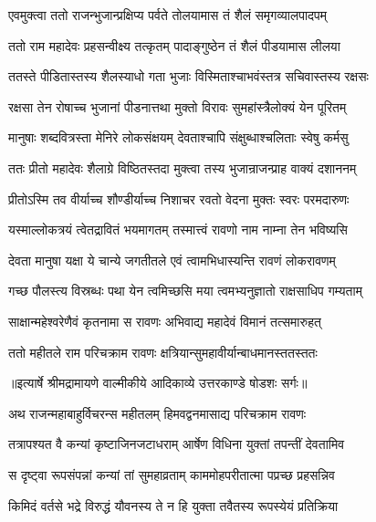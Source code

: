 \twolineshloka
{एवमुक्त्वा ततो राजन्भुजान्प्रक्षिप्य पर्वते}
{तोलयामास तं शैलं समृगव्यालपादपम्} %

\twolineshloka
{ततो राम महादेवः प्रहसन्वीक्ष्य तत्कृतम्}
{पादाङ्गुष्ठेन तं शैलं पीडयामास लीलया} %

\twolineshloka
{ततस्ते पीडितास्तस्य शैलस्याधो गता भुजाः}
{विस्मिताश्चाभवंस्तत्र सचिवास्तस्य रक्षसः} %

\twolineshloka
{रक्षसा तेन रोषाच्च भुजानां पीडनात्तथा}
{मुक्तो विरावः सुमहांस्त्रैलोक्यं येन पूरितम्} %

\twolineshloka
{मानुषाः शब्दवित्रस्ता मेनिरे लोकसंक्षयम्}
{देवताश्चापि संक्षुब्धाश्चलिताः स्वेषु कर्मसु} %

\twolineshloka
{ततः प्रीतो महादेवः शैलाग्रे विष्ठितस्तदा}
{मुक्त्वा तस्य भुजान्राजन्प्राह वाक्यं दशाननम्} %

\twolineshloka
{प्रीतोऽस्मि तव वीर्याच्च शौण्डीर्याच्च निशाचर}
{रवतो वेदना मुक्तः स्वरः परमदारुणः} %

\twolineshloka
{यस्माल्लोकत्रयं त्वेतद्रावितं भयमागतम्}
{तस्मात्त्वं रावणो नाम नाम्ना तेन भविष्यसि} %

\twolineshloka
{देवता मानुषा यक्षा ये चान्ये जगतीतले}
{एवं त्वामभिधास्यन्ति रावणं लोकरावणम्} %

\twolineshloka
{गच्छ पौलस्त्य विस्रब्धः पथा येन त्वमिच्छसि}
{मया त्वमभ्यनुज्ञातो राक्षसाधिप गम्यताम्} %

\twolineshloka
{साक्षान्महेश्वरेणैवं कृतनामा स रावणः}
{अभिवाद्य महादेवं विमानं तत्समारुहत्} %

\twolineshloka
{ततो महीतले राम परिचक्राम रावणः}
{क्षत्रियान्सुमहावीर्यान्बाधमानस्ततस्ततः} %


{॥इत्यार्षे श्रीमद्रामायणे वाल्मीकीये आदिकाव्ये उत्तरकाण्डे षोडशः सर्गः॥}


\twolineshloka
{अथ राजन्महाबाहुर्विचरन्स महीतलम्}
{हिमवद्वनमासाद्य परिचक्राम रावणः} %

\twolineshloka
{तत्रापश्यत वै कन्यां कृष्टाजिनजटाधराम्}
{आर्षेण विधिना युक्तां तपन्तीं देवतामिव} %

\twolineshloka
{स दृष्ट्वा रूपसंपन्नां कन्यां तां सुमहाव्रताम्}
{काममोहपरीतात्मा पप्रच्छ प्रहसन्निव} %

\twolineshloka
{किमिदं वर्तसे भद्रे विरुद्धं यौवनस्य ते}
{न हि युक्ता तवैतस्य रूपस्येयं प्रतिक्रिया} %

